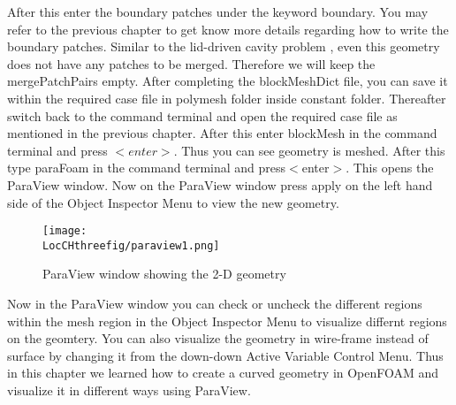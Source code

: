 \flushleft After this enter the boundary patches under the keyword boundary. You may refer to the previous chapter to get know more details regarding how to write the boundary patches.
\flushleft Similar to the lid-driven cavity problem , even this geometry does not have any patches to be merged. Therefore we will keep the mergePatchPairs empty.
\flushleft After completing the blockMeshDict file, you can save it within the required case file in polymesh folder inside constant folder. Thereafter switch back to the command terminal and open the required case file as mentioned in the previous chapter.
\flushleft After this enter blockMesh in the command terminal and press $<enter>$. Thus you can see geometry is meshed. After this type paraFoam in the command terminal and press{$<$}enter{$>$}. This opens the ParaView window. Now on the ParaView window press apply on the left hand side of the Object Inspector Menu to view the new geometry.

\begin{figure}[ht]  
\begin{center}  
\texttt{[image: \\LocCHthreefig/paraview1.png]}
\caption{ParaView window showing the 2-D geometry}
\label{paraview1}
\end{center}  
\end{figure}

\flushleft Now in the ParaView window you can check or uncheck the different regions within the mesh region in  the Object Inspector Menu to visualize differnt regions on the geomtery. You can also visualize the geometry in wire-frame instead of surface by changing it from the down-down Active Variable Control Menu.
\flushleft Thus in this chapter we learned how to create a curved geometry in OpenFOAM and visualize it in different ways using ParaView.
